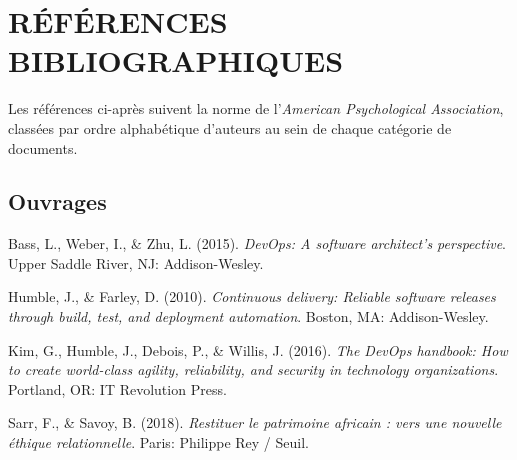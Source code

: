\cleardoublepage
{}
\chapter*{RÉFÉRENCES BIBLIOGRAPHIQUES}

\newenvironment{apalist}
  {\begin{list}{}{%
     \setlength{\leftmargin}{1.27cm}%
     \setlength{\itemindent}{-1.27cm}%
     \setlength{\listparindent}{0pt}%
     \setlength{\itemsep}{0.55em}%
     \setlength{\parsep}{0pt}%
     \setlength{\topsep}{0.5em}}\sloppy}
  {\end{list}}

Les références ci-après suivent la norme de l'\emph{American Psychological
Association}, classées par ordre alphabétique d'auteurs au sein de chaque
catégorie de documents.

\section*{Ouvrages}

\begin{apalist}
\item Bass, L., Weber, I., \& Zhu, L. (2015). \emph{DevOps: A software
      architect's perspective}. Upper Saddle River, NJ: Addison-Wesley.

\item Humble, J., \& Farley, D. (2010). \emph{Continuous delivery: Reliable
      software releases through build, test, and deployment automation}. Boston,
      MA: Addison-Wesley.

\item Kim, G., Humble, J., Debois, P., \& Willis, J. (2016). \emph{The DevOps
      handbook: How to create world-class agility, reliability, and security in
      technology organizations}. Portland, OR: IT Revolution Press.

\item Sarr, F., \& Savoy, B. (2018). \emph{Restituer le patrimoine africain :
      vers une nouvelle éthique relationnelle}. Paris: Philippe Rey / Seuil.
\end{apalist}

